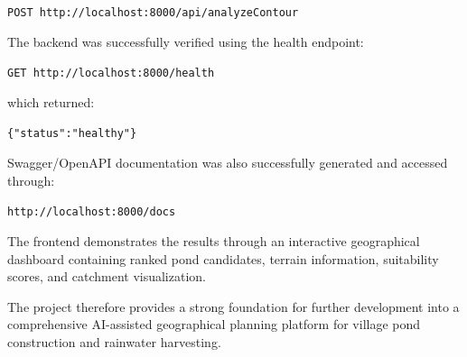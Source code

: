 \documentclass[12pt,a4paper]{article}
\begin{document}
\begin{center}
\texttt{POST http://localhost:8000/api/analyzeContour}
\end{center}

The backend was successfully verified using the health endpoint:

\begin{center}
\texttt{GET http://localhost:8000/health}
\end{center}

which returned:

\begin{verbatim}
{"status":"healthy"}
\end{verbatim}

Swagger/OpenAPI documentation was also successfully generated and accessed through:

\begin{center}
\texttt{http://localhost:8000/docs}
\end{center}

The frontend demonstrates the results through an interactive geographical dashboard
containing ranked pond candidates, terrain information, suitability scores, and
catchment visualization.

The project therefore provides a strong foundation for further development into a
comprehensive AI-assisted geographical planning platform for village pond construction
and rainwater harvesting.
\end{document}
